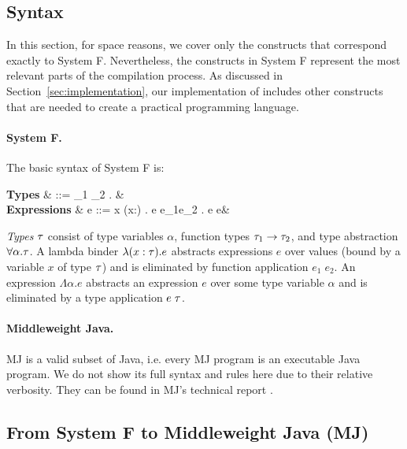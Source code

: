 \subsection{Syntax}

In this section, for space reasons, we cover only the \name constructs
that correspond exactly to System F. Nevertheless, the constructs in
System F represent the most relevant parts of the compilation
process. As discussed in Section~\ref{sec:implementation}, our
implementation of \name includes other constructs that are
needed to create a practical programming language.

\paragraph{System F.}
The basic syntax of System F is:


    \textbf{Types} & \type  ::=  \alpha \mid \type_1 \arrow \type_2
    \mid \forall \alpha. \type & \\
	\textbf{Expressions} & e  ::=  x \mid \lambda (x:\type) . e \mid e_1\;e_2 \mid \Lambda \alpha . e \mid e\;\type &
\ea
\eda

\noindent \emph{Types} $\tau$ consist of type variables $\alpha$,
function types $\tau_1 \rightarrow \tau_2$, and type abstraction $\forall
\alpha. \tau$. A lambda binder $\lambda (x:\tau) . e$ abstracts
expressions $e$ over values (bound by a variable $x$ of type $\tau$)
and is eliminated by function application $e_1\;e_2$. An expression
$\Lambda \alpha . e$ abstracts an expression $e$ over some type
variable $\alpha$ and is eliminated by a type application $e\;\tau$.

\paragraph{Middleweight Java.} MJ is a valid subset of Java, 
i.e. every MJ program is an executable Java program. 
We do not show its full syntax and rules here due to their relative verbosity. 
They can be found in MJ's technical report \cite{bierman03imperative}.

\subsection{From System F to Middleweight Java (MJ)}

